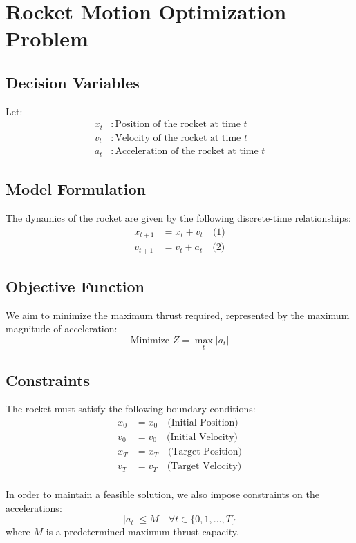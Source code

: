 \documentclass{article}
\begin{document}
\section*{Rocket Motion Optimization Problem}

\subsection*{Decision Variables}
Let:
\begin{align*}
x_t & : \text{Position of the rocket at time } t \\
v_t & : \text{Velocity of the rocket at time } t \\
a_t & : \text{Acceleration of the rocket at time } t
\end{align*}

\subsection*{Model Formulation}
The dynamics of the rocket are given by the following discrete-time relationships:
\begin{align}
x_{t+1} &= x_t + v_t \quad \text{(1)} \\
v_{t+1} &= v_t + a_t \quad \text{(2)}
\end{align}

\subsection*{Objective Function}
We aim to minimize the maximum thrust required, represented by the maximum magnitude of acceleration:
\[
\text{Minimize } Z = \max_{t} |a_t|
\]

\subsection*{Constraints}
The rocket must satisfy the following boundary conditions:
\begin{align}
x_0 &= x_0 \quad \text{(Initial Position)} \\
v_0 &= v_0 \quad \text{(Initial Velocity)} \\
x_T &= x_T \quad \text{(Target Position)} \\
v_T &= v_T \quad \text{(Target Velocity)} \\
\end{align}

In order to maintain a feasible solution, we also impose constraints on the accelerations:
\[
|a_t| \leq M \quad \forall t \in \{0, 1, \ldots, T\}
\]
where \( M \) is a predetermined maximum thrust capacity.
\end{document}
